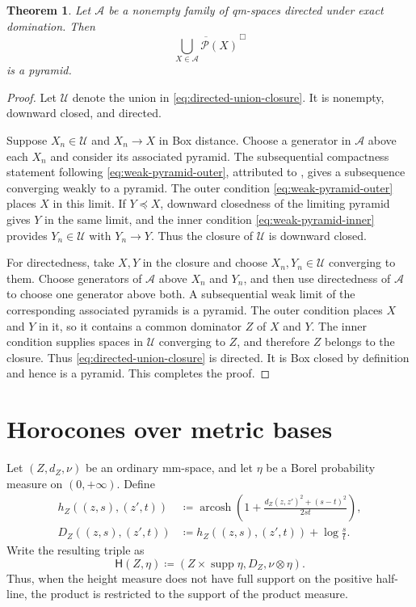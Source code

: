 \documentclass[10pt,a4paper]{amsart}
\numberwithin{equation}{section}
\newtheorem{theorem}{Theorem}[section]
\newcommand{\Pyr}{\mathcal P}
\DeclareMathOperator{\supp}{supp}
\DeclareMathOperator{\arcosh}{arcosh}
\begin{document}
\begin{theorem}\label{thm:directed-union-closure}
Let $\mathscr A$ be a nonempty family of qm-spaces directed under exact domination.  Then
\begin{equation}\label{eq:directed-union-closure} \overline{\bigcup_{X\in\mathscr A}\Pyr(X)}^{\,\Box} \end{equation}
is a pyramid.
\end{theorem}

\begin{proof}
Let $\mathcal U$ denote the union in \eqref{eq:directed-union-closure}.  It is nonempty, downward closed, and directed.

Suppose $X_n\in\mathcal U$ and $X_n\to X$ in Box distance.  Choose a generator in $\mathscr A$ above each $X_n$ and consider its associated pyramid.  The subsequential compactness statement following \eqref{eq:weak-pyramid-outer}, attributed to \cite[Corollary~5.3]{gds3-ja}, gives a subsequence converging weakly to a pyramid.  The outer condition \eqref{eq:weak-pyramid-outer} places $X$ in this limit.  If $Y\preceq X$, downward closedness of the limiting pyramid gives $Y$ in the same limit, and the inner condition \eqref{eq:weak-pyramid-inner} provides $Y_n\in\mathcal U$ with $Y_n\to Y$.  Thus the closure of $\mathcal U$ is downward closed.

For directedness, take $X,Y$ in the closure and choose $X_n,Y_n\in\mathcal U$ converging to them.  Choose generators of $\mathscr A$ above $X_n$ and $Y_n$, and then use directedness of $\mathscr A$ to choose one generator above both.  A subsequential weak limit of the corresponding associated pyramids is a pyramid.  The outer condition places $X$ and $Y$ in it, so it contains a common dominator $Z$ of $X$ and $Y$.  The inner condition supplies spaces in $\mathcal U$ converging to $Z$, and therefore $Z$ belongs to the closure.  Thus \eqref{eq:directed-union-closure} is directed.  It is Box closed by definition and hence is a pyramid.
	This completes the proof.
\end{proof}

\section{Horocones over metric bases}\label{app:horocones}

Let $(Z,d_Z,\nu)$ be an ordinary mm-space, and let $\eta$ be a Borel probability measure on $(0,+\infty)$.  Define
\begin{align}
 h_Z((z,s),(z',t))
 &\coloneqq\arcosh\left(1+\frac{d_Z(z,z')^2+(s-t)^2}{2st}\right),
 \label{eq:general-horocone-symmetric}\\
D_Z((z,s),(z',t)) &\coloneqq h_Z((z,s),(z',t))+\log\frac{s}{t}. \label{eq:general-horocone-directed}
\end{align}
Write the resulting triple as
\begin{equation}\label{eq:general-horocone-space}
 \mathsf H(Z,\eta)\coloneqq(Z\times\supp\eta,D_Z,\nu\otimes\eta).
\end{equation}
Thus, when the height measure does not have full support on the positive half-line, the product is restricted to the support
of the product measure.
\end{document}
